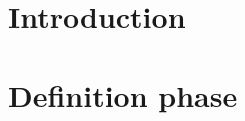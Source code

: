 \documentclass[openany]{article}
\begin{document}




\tableofcontents
\newpage

\section{Introduction}

\newpage

\section{Definition phase}

\end{document}
